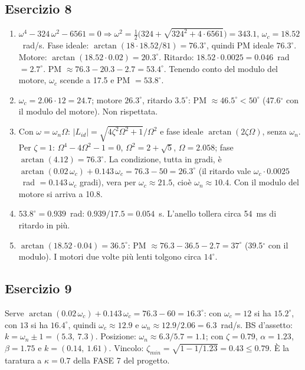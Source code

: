 \documentclass[11pt,a4paper]{article}
\begin{document}
\subsection*{Esercizio 8}
\begin{enumerate}[label=(\alph*)]
  \item $\omega^4 - 324\,\omega^2 - 6561 = 0 \Rightarrow \omega^2 = \tfrac12\big(324 + \sqrt{324^2 + 4 \cdot 6561}\big) = 343.1$, $\omega_c = 18.52$~rad/s. Fase ideale: $\arctan(18 \cdot 18.52/81) = 76.3^\circ$, quindi PM ideale $76.3^\circ$. Motore: $\arctan(18.52 \cdot 0.02) = 20.3^\circ$. Ritardo: $18.52 \cdot 0.0025 = 0.046$~rad $= 2.7^\circ$. PM $\approx 76.3 - 20.3 - 2.7 = 53.4^\circ$. Tenendo conto del modulo del motore, $\omega_c$ scende a 17.5 e PM $= 53.8^\circ$.
  \item $\omega_c = 2.06 \cdot 12 = 24.7$; motore $26.3^\circ$, ritardo $3.5^\circ$: PM $\approx 46.5^\circ < 50^\circ$ (47.6$^\circ$ con il modulo del motore). Non rispettata.
  \item Con $\omega = \omega_n\Omega$: $|L_{id}| = \sqrt{4\zeta^2\Omega^2 + 1}/\Omega^2$ e fase ideale $\arctan(2\zeta\Omega)$, senza $\omega_n$. Per $\zeta = 1$: $\Omega^4 - 4\Omega^2 - 1 = 0$, $\Omega^2 = 2 + \sqrt5$, $\Omega = 2.058$; fase $\arctan(4.12) = 76.3^\circ$. La condizione, tutta in gradi, è $\arctan(0.02\,\omega_c) + 0.143\,\omega_c = 76.3 - 50 = 26.3^\circ$ (il ritardo vale $\omega_c \cdot 0.0025$~rad $= 0.143\,\omega_c$ gradi), vera per $\omega_c \approx 21.5$, cioè $\omega_n \approx 10.4$. Con il modulo del motore si arriva a 10.8.
  \item $53.8^\circ = 0.939$~rad: $0.939/17.5 = 0.054$~s. L'anello tollera circa 54~ms di ritardo in più.
  \item $\arctan(18.52 \cdot 0.04) = 36.5^\circ$: PM $\approx 76.3 - 36.5 - 2.7 = 37^\circ$ (39.5$^\circ$ con il modulo). I motori due volte più lenti tolgono circa $14^\circ$.
\end{enumerate}

\subsection*{Esercizio 9}
Serve $\arctan(0.02\,\omega_c) + 0.143\,\omega_c = 76.3 - 60 = 16.3^\circ$: con $\omega_c = 12$ si ha $15.2^\circ$, con $13$ si ha $16.4^\circ$, quindi $\omega_c \approx 12.9$ e $\omega_n \approx 12.9/2.06 = 6.3$~rad/s. BS d'assetto: $k = \omega_n \pm 1 = (5.3,\ 7.3)$. Posizione: $\omega_n \approx 6.3/5.7 = 1.1$; con $\zeta = 0.79$, $\alpha = 1.23$, $\beta = 1.75$ e $k = (0.14,\ 1.61)$. Vincolo: $\zeta_{min} = \sqrt{1 - 1/1.23} = 0.43 \le 0.79$. È la taratura a $\kappa = 0.7$ della FASE 7 del progetto.
\end{document}
